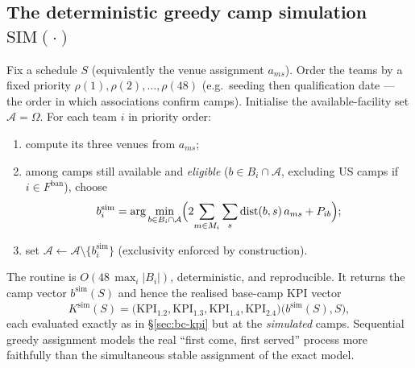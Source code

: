 \documentclass[12pt, letterpaper]{article}
\begin{document}
\subsection{The deterministic greedy camp simulation
$\mathrm{SIM}(\cdot)$}
Fix a schedule $S$ (equivalently the venue assignment $a_{ms}$). Order the
teams by a fixed priority $\rho(1),\rho(2),\dots,\rho(48)$ (e.g.\ seeding
then qualification date --- the order in which associations confirm
camps). Initialise the available-facility set $\mathcal A=\Omega$. For
each team $i$ in priority order:
\begin{enumerate}[leftmargin=1.6em, itemsep=1pt]
  \item compute its three venues from $a_{ms}$;
  \item among camps still available and \emph{eligible}
        ($b\in B_i\cap\mathcal A$, excluding US camps if
        $i\in F^{\mathrm{ban}}$), choose
        \begin{equation}
        b_i^{\mathrm{sim}}=\arg\min_{b\in B_i\cap\mathcal A}
          \Bigl(2\!\sum_{m\in M_i}\sum_{s} \mathrm{dist}(b,s)\,a_{ms}
                + P_{ib}\Bigr);
        \end{equation}
  \item set $\mathcal A\leftarrow\mathcal A\setminus\{b_i^{\mathrm{sim}}\}$
        (exclusivity enforced by construction).
\end{enumerate}
The routine is $O(48\,\max_i|B_i|)$, deterministic, and reproducible. It
returns the camp vector $b^{\mathrm{sim}}(S)$ and hence the realised
base-camp KPI vector
\begin{equation}
K^{\mathrm{sim}}(S)=\bigl(\mathrm{KPI}_{1.2},\mathrm{KPI}_{1.3},
\mathrm{KPI}_{1.4},\mathrm{KPI}_{2.4}\bigr)\bigl(b^{\mathrm{sim}}(S),S\bigr),
\end{equation}
each evaluated exactly as in \S\ref{sec:bc-kpi} but at the \emph{simulated}
camps. Sequential greedy assignment models the real ``first come, first
served'' process more faithfully than the simultaneous stable assignment
of the exact model.
\end{document}
